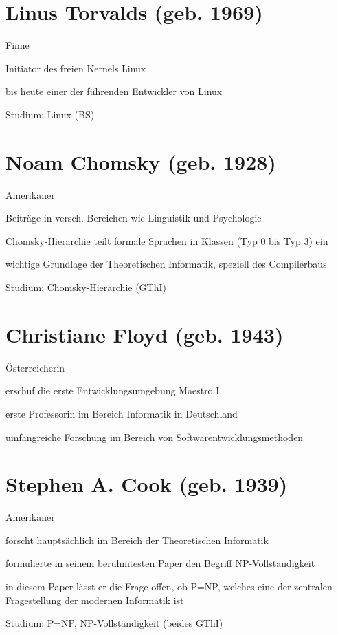 \documentclass[a4paper,12pt]{report}
\begin{document}
\section*{Linus Torvalds (geb. 1969)}
\begin{itemize*}
	\item Finne
	\item Initiator des freien Kernels Linux
	\item bis heute einer der führenden Entwickler von Linux
	\item Studium: Linux (BS)
\end{itemize*}

\section*{Noam Chomsky (geb. 1928)}
\begin{itemize*}
	\item Amerikaner
	\item Beiträge in versch. Bereichen wie Linguistik und Psychologie
	\item Chomsky-Hierarchie teilt formale Sprachen in Klassen (Typ 0 bis Typ 3) ein
	\item wichtige Grundlage der Theoretischen Informatik, speziell des Compilerbaus
	\item Studium: Chomsky-Hierarchie (GThI)
\end{itemize*}

\section*{Christiane Floyd (geb. 1943)}
\begin{itemize*}
	\item Österreicherin
	\item erschuf die erste Entwicklungsumgebung Maestro I
	\item erste Professorin im Bereich Informatik in Deutschland
	\item umfangreiche Forschung im Bereich von Softwarentwicklungsmethoden
\end{itemize*}

\section*{Stephen A. Cook (geb. 1939)}
\begin{itemize*}
	\item Amerikaner
	\item forscht hauptsächlich im Bereich der Theoretischen Informatik
	\item formulierte in seinem berühmtesten Paper den Begriff NP-Vollständigkeit
	\item in diesem Paper lässt er die Frage offen, ob P=NP, welches eine der zentralen Fragestellung der modernen Informatik ist
	\item Studium: P=NP, NP-Vollständigkeit (beides GThI)
\end{itemize*}
\end{document}
